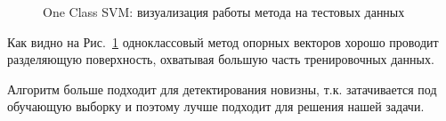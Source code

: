 \documentclass[12pt]{article}
\begin{document}
    \begin{figure}[h!]
        \centering
        \caption{One Class SVM: визуализация работы метода на тестовых данных}
        \label{sec:Research:Model:Visualization:fig:OneClassSVM}
    \end{figure}

    \par Как видно на Рис.~\ref{sec:Research:Model:Visualization:fig:OneClassSVM} одноклассовый метод опорных векторов хорошо проводит разделяющую поверхность, охватывая большую часть тренировочных данных.

    \par Алгоритм больше подходит для детектирования новизны, т.к. затачивается под обучающую выборку и поэтому лучше подходит для решения нашей задачи.
    
\end{document}
